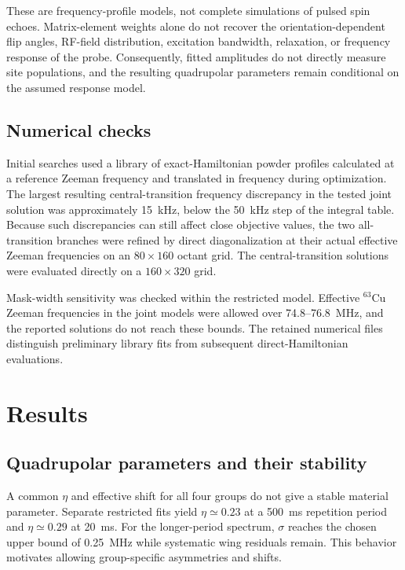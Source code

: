\documentclass[10pt,a4paper,twocolumn]{article}
\begin{document}
These are frequency-profile models, not complete simulations of pulsed spin echoes. Matrix-element weights alone do not recover the orientation-dependent flip angles, RF-field distribution, excitation bandwidth, relaxation, or frequency response of the probe. Consequently, fitted amplitudes do not directly measure site populations, and the resulting quadrupolar parameters remain conditional on the assumed response model.

\subsection{Numerical checks}

Initial searches used a library of exact-Hamiltonian powder profiles calculated at a reference Zeeman frequency and translated in frequency during optimization. The largest resulting central-transition frequency discrepancy in the tested joint solution was approximately 15~kHz, below the 50~kHz step of the integral table. Because such discrepancies can still affect close objective values, the two all-transition branches were refined by direct diagonalization at their actual effective Zeeman frequencies on an $80\times160$ octant grid. The central-transition solutions were evaluated directly on a $160\times320$ grid.

Mask-width sensitivity was checked within the restricted model. Effective $^{63}$Cu Zeeman frequencies in the joint models were allowed over 74.8--76.8~MHz, and the reported solutions do not reach these bounds. The retained numerical files distinguish preliminary library fits from subsequent direct-Hamiltonian evaluations.

\section{Results}

\subsection{Quadrupolar parameters and their stability}

A common $\eta$ and effective shift for all four groups do not give a stable material parameter. Separate restricted fits yield $\eta\simeq0.23$ at a 500~ms repetition period and $\eta\simeq0.29$ at 20~ms. For the longer-period spectrum, $\sigma$ reaches the chosen upper bound of 0.25~MHz while systematic wing residuals remain. This behavior motivates allowing group-specific asymmetries and shifts.
\end{document}
